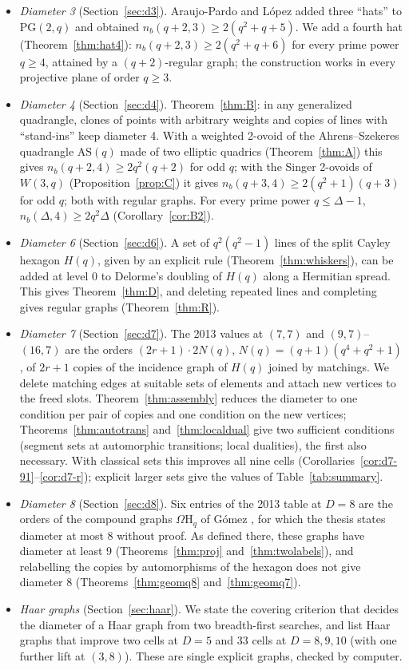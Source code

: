 \documentclass[11pt]{amsart}
\theoremstyle{definition}
\theoremstyle{remark}
\numberwithin{equation}{section}
\newcommand{\PG}{\mathrm{PG}}
\newcommand{\AS}{\mathrm{AS}}
\newcommand{\nb}{n_b}
\newcommand{\Om}{\Omega\mathrm H}
\begin{document}
\begin{itemize}
\item \emph{Diameter 3} (Section~\ref{sec:d3}). Araujo-Pardo and L\'opez \cite{AL20} added three ``hats'' to
  $\PG(2,q)$ and obtained $\nb(q+2,3)\ge2(q^2+q+5)$. We add a fourth hat (Theorem~\ref{thm:hat4}):
  $\nb(q+2,3)\ge2(q^2+q+6)$ for every prime power $q\ge4$, attained by a $(q+2)$-regular graph; the construction works
  in every projective plane of order $q\ge3$.
\item \emph{Diameter 4} (Section~\ref{sec:d4}). Theorem~\ref{thm:B}: in any generalized quadrangle, clones of points
  with arbitrary weights and copies of lines with ``stand-ins'' keep diameter 4. With a weighted 2-ovoid of the
  Ahrens--Szekeres quadrangle $\AS(q)$ made of two elliptic quadrics (Theorem~\ref{thm:A}) this gives
  $\nb(q+2,4)\ge2q^2(q+2)$ for odd $q$; with the Singer 2-ovoids of $W(3,q)$ (Proposition~\ref{prop:C}) it gives
  $\nb(q+3,4)\ge2(q^2+1)(q+3)$ for odd $q$; both with regular graphs. For every prime power $q\le\Delta-1$,
  $\nb(\Delta,4)\ge2q^2\Delta$ (Corollary~\ref{cor:B2}).
\item \emph{Diameter 6} (Section~\ref{sec:d6}). A set of $q^2(q^2-1)$ lines of the split Cayley hexagon $H(q)$, given by
  an explicit rule (Theorem~\ref{thm:whiskers}), can be added at level 0 to Delorme's doubling of $H(q)$ along a
  Hermitian spread. This gives Theorem~\ref{thm:D}, and deleting repeated lines and completing gives regular graphs
  (Theorem~\ref{thm:R}).
\item \emph{Diameter 7} (Section~\ref{sec:d7}). The 2013 values at $(7,7)$ and $(9,7)$--$(16,7)$ are the orders
  $(2r+1)\cdot2N(q)$, $N(q)=(q+1)(q^4+q^2+1)$, of $2r+1$ copies of the incidence graph of $H(q)$ joined by matchings. We delete matching
  edges at suitable sets of elements and attach new vertices to the freed slots. Theorem~\ref{thm:assembly} reduces the
  diameter to one condition per pair of copies and one condition on the new vertices; Theorems~\ref{thm:autotrans} and~\ref{thm:localdual} give two
  sufficient conditions (segment sets at automorphic transitions; local dualities), the first also necessary. With
  classical sets this improves all nine cells (Corollaries~\ref{cor:d7-91}--\ref{cor:d7-r}); explicit larger sets give
  the values of Table~\ref{tab:summary}.
\item \emph{Diameter 8} (Section~\ref{sec:d8}). Six entries of the 2013 table at $D=8$ are the orders of the compound
  graphs $\Om_q$ of G\'omez \cite{Go86}, for which the thesis states diameter at most 8 without proof. As defined there,
  these graphs have diameter at least 9 (Theorems~\ref{thm:proj} and~\ref{thm:twolabels}), and relabelling the copies
  by automorphisms of the hexagon does not give diameter 8 (Theorems~\ref{thm:geomq8} and~\ref{thm:geomq7}).
\item \emph{Haar graphs} (Section~\ref{sec:haar}). We state the covering criterion that decides the diameter of a Haar
  graph from two breadth-first searches, and list Haar graphs that improve two cells at $D=5$ and 33 cells at
  $D=8,9,10$ (with one further lift at $(3,8)$). These are single explicit graphs, checked by computer.
\end{itemize}
\end{document}
